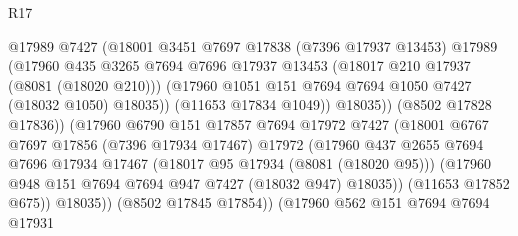 \begin{lexlean}{R17}
\begin{coremodule}
                                  @17989
                                  @7427
                                  (@18001
                                    @3451
                                    @7697
                                    @17838
                                    (@7396 @17937 @13453)
                                    @17989
                                    (@17960
                                      @435
                                      @3265
                                      @7694
                                      @7696
                                      @17937
                                      @13453
                                      (@18017 @210 @17937 (@8081 (@18020 @210)))
                                      (@17960
                                        @1051
                                        @151
                                        @7694
                                        @7694
                                        @1050
                                        @7427
                                        (@18032 @1050)
                                        @18035))
                                    (@11653 @17834 @1049))
                                  @18035))
                              (@8502 @17828 @17836))
                            (@17960
                              @6790
                              @151
                              @17857
                              @7694
                              @17972
                              @7427
                              (@18001
                                @6767
                                @7697
                                @17856
                                (@7396 @17934 @17467)
                                @17972
                                (@17960
                                  @437
                                  @2655
                                  @7694
                                  @7696
                                  @17934
                                  @17467
                                  (@18017 @95 @17934 (@8081 (@18020 @95)))
                                  (@17960 @948 @151 @7694 @7694 @947 @7427 (@18032 @947) @18035))
                                (@11653 @17852 @675))
                              @18035))
                          (@8502 @17845 @17854))
                        (@17960
                          @562
                          @151
                          @7694
                          @7694
                          @17931

\end{coremodule}
\end{lexlean}
